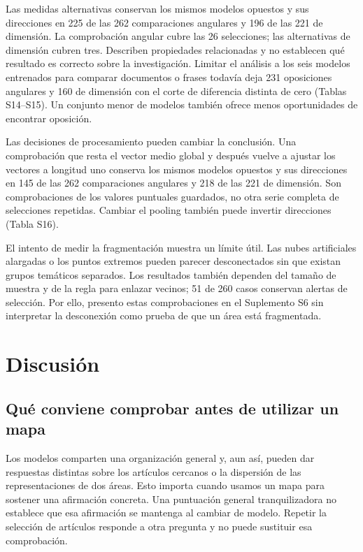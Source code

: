 \documentclass[12pt]{article}
\begin{document}
Las medidas alternativas conservan los mismos modelos opuestos y sus direcciones en 225 de las 262 comparaciones angulares y 196 de las 221 de dimensión. La comprobación angular cubre las 26 selecciones; las alternativas de dimensión cubren tres. Describen propiedades relacionadas y no establecen qué resultado es correcto sobre la investigación. Limitar el análisis a los seis modelos entrenados para comparar documentos o frases todavía deja 231 oposiciones angulares y 160 de dimensión con el corte de diferencia distinta de cero (Tablas S14--S15). Un conjunto menor de modelos también ofrece menos oportunidades de encontrar oposición.

Las decisiones de procesamiento pueden cambiar la conclusión. Una comprobación que resta el vector medio global y después vuelve a ajustar los vectores a longitud uno conserva los mismos modelos opuestos y sus direcciones en 145 de las 262 comparaciones angulares y 218 de las 221 de dimensión. Son comprobaciones de los valores puntuales guardados, no otra serie completa de selecciones repetidas. Cambiar el pooling también puede invertir direcciones (Tabla S16).

El intento de medir la fragmentación muestra un límite útil. Las nubes artificiales alargadas o los puntos extremos pueden parecer desconectados sin que existan grupos temáticos separados. Los resultados también dependen del tamaño de muestra y de la regla para enlazar vecinos; 51 de 260 casos conservan alertas de selección. Por ello, presento estas comprobaciones en el Suplemento S6 sin interpretar la desconexión como prueba de que un área está fragmentada.

\FloatBarrier
\section{Discusión}
\subsection{Qué conviene comprobar antes de utilizar un mapa}
Los modelos comparten una organización general y, aun así, pueden dar respuestas distintas sobre los artículos cercanos o la dispersión de las representaciones de dos áreas. Esto importa cuando usamos un mapa para sostener una afirmación concreta. Una puntuación general tranquilizadora no establece que esa afirmación se mantenga al cambiar de modelo. Repetir la selección de artículos responde a otra pregunta y no puede sustituir esa comprobación.
\end{document}

